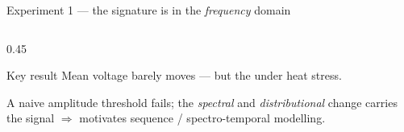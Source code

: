 \documentclass[aspectratio=169,11pt]{beamer}
\begin{document}
\begin{frame}{Experiment 1 — the signature is in the \emph{frequency} domain}
  \begin{columns}[T]
    \begin{column}{0.45\textwidth}
      \begin{block}{Key result}
        Mean voltage barely moves — but the  under heat stress.
      \end{block}
      A naive amplitude threshold fails; the \emph{spectral} and
      \emph{distributional} change carries the signal $\Rightarrow$ motivates
      sequence / spectro-temporal modelling.
    \end{column}
  \end{columns}
\end{frame}
\end{document}
